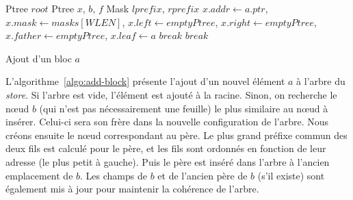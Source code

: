 \begin{algorithm}[h!]
\begin{algorithmic}[1]
\Statex Ptree $root$
\Statex
{}
\Statex Ptree $x$, $b$, $f$
\Statex Mask $lprefix$, $rprefix$
\State $x.addr \gets a.ptr$, $x.mask \gets masks[WLEN]$, $x.left \gets emptyPtree$,
\State $x.right \gets emptyPtree$, $x.father \gets emptyPtree$, $x.leaf \gets a$
\Else
      \State $\mathit{break}$
    \EndIf
    \Else
      \State $\mathit{break}$
    \EndIf
  \EndWhile
  \Else
  \EndIf
  \Else
    \Else
    \EndIf
  \EndIf
  \EndIf
\EndIf
\EndProcedure
\end{algorithmic}
\caption{Ajout d'un bloc $a$
  \label{algo:add-block}}
\end{algorithm}

L'algorithme~\ref{algo:add-block} présente l'ajout d'un nouvel élément $a$ à
l'arbre du {\em store}.
Si l'arbre est vide, l'élément est ajouté à la racine.
Sinon, on recherche le n\oe{}ud $b$ (qui n'est pas nécessairement une feuille)
le plus similaire au n\oe{}ud à insérer.
Celui-ci sera son frère dans la nouvelle configuration de l'arbre.
Nous créons ensuite le n\oe{}ud correspondant au père.
Le plus grand préfixe commun des deux fils est calculé pour le père, et les fils
sont ordonnés en fonction de leur adresse (le plus petit à gauche).
Puis le père est inséré dans l'arbre à l'ancien emplacement de $b$.
Les champs de $b$ et de l'ancien père de $b$ (s'il existe) sont également mis à
jour pour maintenir la cohérence de l'arbre.


